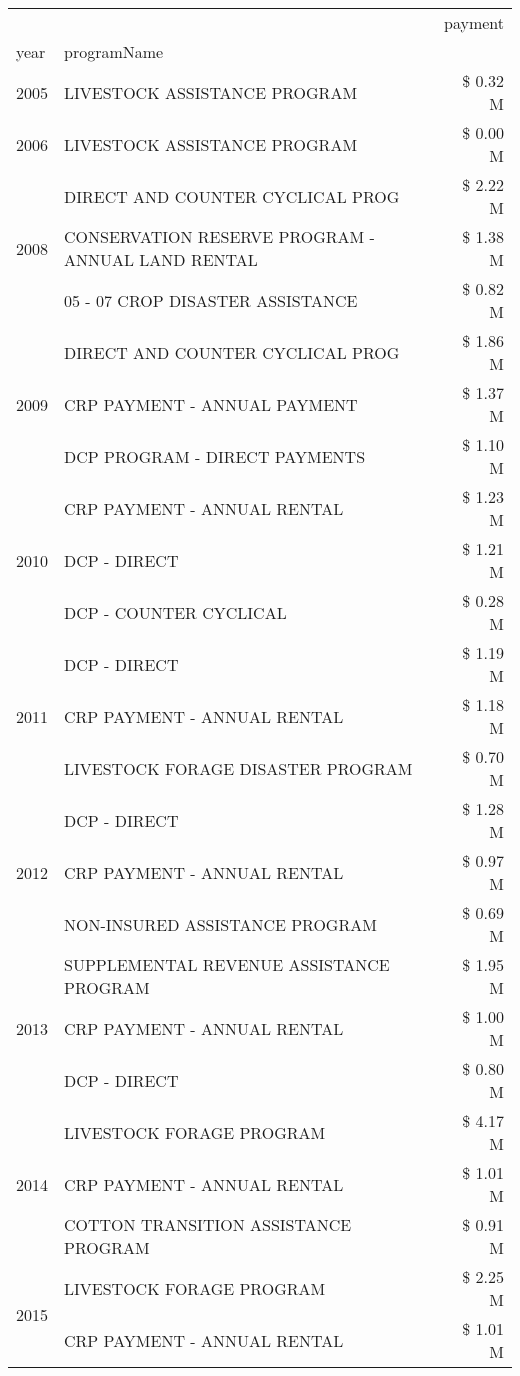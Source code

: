 \begin{tabular}{llr}
\toprule
 &  & payment \\
year & programName &  \\
\midrule
2005 & LIVESTOCK ASSISTANCE PROGRAM & \$ 0.32 M \\
\cline{1-3}
2006 & LIVESTOCK ASSISTANCE PROGRAM & \$ 0.00 M \\
\cline{1-3}
\multirow[t]{3}{*}{2008} & DIRECT AND COUNTER CYCLICAL PROG & \$ 2.22 M \\
 & CONSERVATION RESERVE PROGRAM - ANNUAL LAND RENTAL & \$ 1.38 M \\
 & 05 - 07 CROP DISASTER ASSISTANCE & \$ 0.82 M \\
\cline{1-3}
\multirow[t]{3}{*}{2009} & DIRECT AND COUNTER CYCLICAL PROG & \$ 1.86 M \\
 & CRP PAYMENT - ANNUAL PAYMENT & \$ 1.37 M \\
 & DCP PROGRAM - DIRECT PAYMENTS & \$ 1.10 M \\
\cline{1-3}
\multirow[t]{3}{*}{2010} & CRP PAYMENT - ANNUAL RENTAL & \$ 1.23 M \\
 & DCP - DIRECT & \$ 1.21 M \\
 & DCP - COUNTER CYCLICAL & \$ 0.28 M \\
\cline{1-3}
\multirow[t]{3}{*}{2011} & DCP - DIRECT & \$ 1.19 M \\
 & CRP PAYMENT - ANNUAL RENTAL & \$ 1.18 M \\
 & LIVESTOCK FORAGE DISASTER PROGRAM & \$ 0.70 M \\
\cline{1-3}
\multirow[t]{3}{*}{2012} & DCP - DIRECT & \$ 1.28 M \\
 & CRP PAYMENT - ANNUAL RENTAL & \$ 0.97 M \\
 & NON-INSURED ASSISTANCE PROGRAM & \$ 0.69 M \\
\cline{1-3}
\multirow[t]{3}{*}{2013} & SUPPLEMENTAL REVENUE ASSISTANCE PROGRAM & \$ 1.95 M \\
 & CRP PAYMENT - ANNUAL RENTAL & \$ 1.00 M \\
 & DCP - DIRECT & \$ 0.80 M \\
\cline{1-3}
\multirow[t]{3}{*}{2014} & LIVESTOCK FORAGE PROGRAM & \$ 4.17 M \\
 & CRP PAYMENT - ANNUAL RENTAL & \$ 1.01 M \\
 & COTTON TRANSITION ASSISTANCE PROGRAM & \$ 0.91 M \\
\cline{1-3}
\multirow[t]{3}{*}{2015} & LIVESTOCK FORAGE PROGRAM & \$ 2.25 M \\
 & CRP PAYMENT - ANNUAL RENTAL & \$ 1.01 M \\

\end{tabular}
